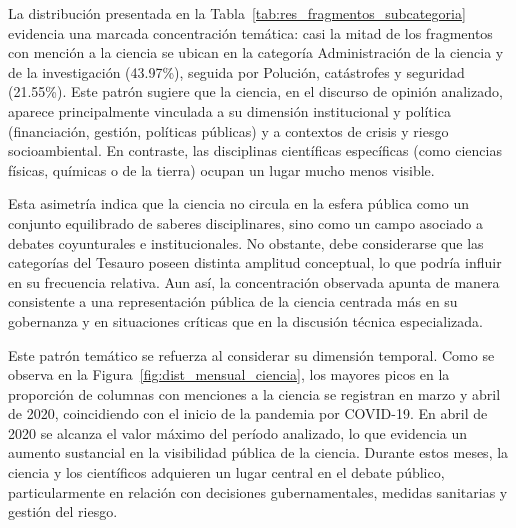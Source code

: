 \documentclass[11pt,a4paper]{article}
\begin{document}

La distribución presentada en la Tabla~\ref{tab:res_fragmentos_subcategoria} evidencia una marcada concentración temática: casi la mitad de los fragmentos con mención a la ciencia se ubican en la categoría Administración de la ciencia y de la investigación (43.97\%), seguida por Polución, catástrofes y seguridad (21.55\%). Este patrón sugiere que la ciencia, en el discurso de opinión analizado, aparece principalmente vinculada a su dimensión institucional y política (financiación, gestión, políticas públicas) y a contextos de crisis y riesgo socioambiental. En contraste, las disciplinas científicas específicas (como ciencias físicas, químicas o de la tierra) ocupan un lugar mucho menos visible.

Esta asimetría indica que la ciencia no circula en la esfera pública como un conjunto equilibrado de saberes disciplinares, sino como un campo asociado a debates coyunturales e institucionales. No obstante, debe considerarse que las categorías del Tesauro poseen distinta amplitud conceptual, lo que podría influir en su frecuencia relativa. Aun así, la concentración observada apunta de manera consistente a una representación pública de la ciencia centrada más en su gobernanza y en situaciones críticas que en la discusión técnica especializada.


Este patrón temático se refuerza al considerar su dimensión temporal. Como se observa en la Figura~\ref{fig:dist_mensual_ciencia}, los mayores picos en la proporción de columnas con menciones a la ciencia se registran en marzo y abril de 2020, coincidiendo con el inicio de la pandemia por COVID-19. En abril de 2020 se alcanza el valor máximo del período analizado, lo que evidencia un aumento sustancial en la visibilidad pública de la ciencia. Durante estos meses, la ciencia y los científicos adquieren un lugar central en el debate público, particularmente en relación con decisiones gubernamentales, medidas sanitarias y gestión del riesgo.
\end{document}
